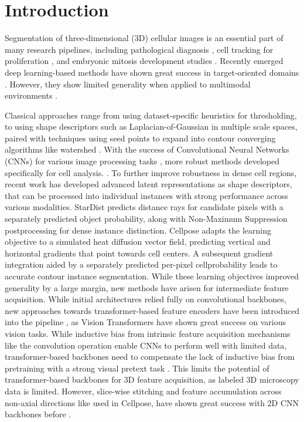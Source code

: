 \chapter{Introduction}

Segmentation of three-dimensional (3D) cellular images is an essential part of many research pipelines, including pathological diagnosis \cite{fischmankeratinocytes}, cell tracking for proliferation \cite{Betjes2024.10.11.617799}, and embryonic mitosis development studies \cite{Stegmaier16}. Recently emerged deep learning-based methods have shown great success in target-oriented domains \cite{fischmankeratinocytes, Zhang2024.04.05.588365}. However, they show limited generality when applied to multimodal environments \cite{lee2022mediarharmonydatacentricmodelcentric}. 

Classical approaches range from using dataset-specific heuristics for thresholding, to using shape descriptors such as Laplacian-of-Gaussian in multiple scale spaces, paired with techniques using seed points to expand into contour converging algorithms like watershed \cite{inproceedings}. 
With the success of Convolutional Neural Networks (CNNs) for various image processing tasks \cite{Krizhevsky.2012}, more robust methods developed specifically for cell analysis. \cite{he2018maskrcnn, ronneberger2015unetconvolutionalnetworksbiomedical}. To further improve robustness in dense cell regions, recent work has developed advanced latent representations as shape descriptors, that can be processed into individual instances with strong performance across various modalities. StarDist \cite{Schmidt_2018} predicts distance rays for candidate pixels with a separately predicted object probability, along with Non-Maximum Suppression postprocessing for dense instance distinction. Cellpose adapts the learning objective to a simulated heat diffusion vector field, predicting vertical and horizontal gradients that point towards cell centers. A subsequent gradient integration aided by a separately predicted per-pixel cellprobability leads to accurate contour instance segmentation.  
While these learning objectives improved generality by a large margin, new methods have arisen for intermediate feature acquisition. While initial architectures relied fully on convolutional backbones, new approaches towards transformer-based feature encoders have been introduced into the pipeline \cite{lee2022mediarharmonydatacentricmodelcentric}, as Vision Transformers \cite{dosovitskiy2021imageworth16x16words} have shown great success on various vision tasks.
While inductive bias from intrinsic feature acquisition mechanisms like the convolution operation enable CNNs to perform well with limited data, transformer-based backbones need to compensate the lack of inductive bias from pretraining with a strong visual pretext task \cite{ryali2023hierahierarchicalvisiontransformer}. This limits the potential of transformer-based backbones for 3D feature acquisition, as labeled 3D microscopy data is limited. However, slice-wise stitching and feature accumulation across non-axial directions like used in Cellpose, have shown great success with 2D CNN backbones before \cite{Stringer.2020}. 

